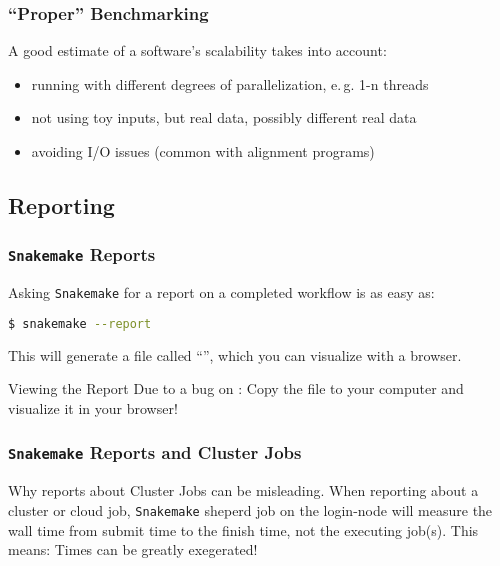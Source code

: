 \begin{frame}
  \frametitle{``Proper'' Benchmarking}
  A good estimate of a software's scalability takes into account:
  \begin{itemize}[<+->]
   \item running with different degrees of parallelization, e.\,g. 1-n threads
   \item not using toy inputs, but real data, possibly different real data
   \item avoiding I/O issues (common with alignment programs)
  \end{itemize}
  \pause
\end{frame}


\subsection{Reporting}


\begin{frame}[fragile]
  \frametitle{\texttt{Snakemake} Reports}
  Asking \texttt{Snakemake} for a report on a completed workflow is as easy as:
  \begin{lstlisting}[language=Bash, style=Shell]
$ snakemake --report
  \end{lstlisting}
  This will generate a file called ``'', which you can visualize with a browser.
  \pause
  \begin{alertblock}{Viewing the Report}
   Due to a bug on \mogon: Copy the file to your computer and visualize it in your browser!
  \end{alertblock}
\end{frame} 

\begin{frame}
  \frametitle{\texttt{Snakemake} Reports and Cluster Jobs}
  \begin{alertblock}{Why reports about Cluster Jobs can be misleading.}
    When reporting about a cluster or cloud job, \texttt{Snakemake} sheperd job on the login-node will measure the wall time from submit time to the finish time, not the executing job(s).\newline
    This means: Times can be greatly exegerated!
  \end{alertblock}
\end{frame} 

